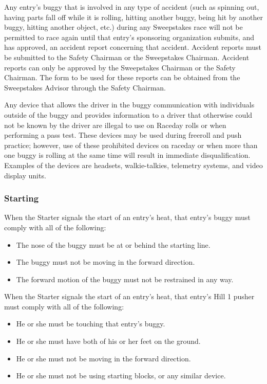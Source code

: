 	Any entry's buggy that is involved in any type of accident (such as spinning out, having parts fall off while it is rolling, hitting another buggy, being hit by another buggy, hitting another object, etc.) during any Sweepstakes race will not be permitted to race again until that entry's sponsoring organization submits, and has approved, an accident report concerning that accident. Accident reports must be submitted to the Safety Chairman or the Sweepstakes Chairman. Accident reports can only be approved by the Sweepstakes Chairman or the Safety Chairman. The form to be used for these reports can be obtained from the Sweepstakes Advisor through the Safety Chairman.

	Any device that allows the driver in the buggy communication with individuals outside of the buggy and provides information to a driver that otherwise could not be known by the driver are illegal to use on Raceday rolls or when performing a pass test. These devices may be used during freeroll and push practice; however, use of these prohibited devices on raceday or when more than one buggy is rolling at the same time will result in immediate disqualification. Examples of the devices are headsets, walkie-talkies, telemetry systems, and video display units.

\subsubsection{Starting}

	When the Starter signals the start of an entry's heat, that entry's buggy must comply with all of the following:

	\begin{itemize}

		\item The nose of the buggy must be at or behind the starting line.

		\item The buggy must not be moving in the forward direction.

		\item The forward motion of the buggy must not be restrained in any way.

	\end{itemize}

	\noindent When the Starter signals the start of an entry's heat, that entry's Hill 1 pusher must comply with all of the following:

	\begin{itemize}

		\item He or she must be touching that entry's buggy.

		\item He or she must have both of his or her feet on the ground.

		\item He or she must not be moving in the forward direction.

		\item He or she must not be using starting blocks, or any similar device.

	\end{itemize}

